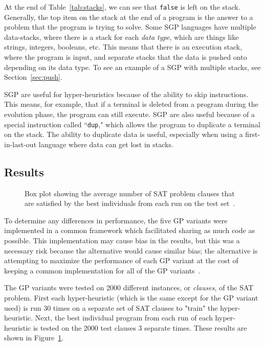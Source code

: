 \documentclass{sig-alternate}
\begin{document}
At the end of Table~\ref{tab:stacks}, we can see that \texttt{false} is left on the stack. Generally, the top item on the stack at the end of a program is the answer to a problem that the program is trying to solve. Some SGP languages have multiple data-stacks, where there is a stack for each \textit{data type}, which are things like strings, integers, booleans, etc. This means that there is an execution stack, where the program is input, and separate stacks that the data is pushed onto depending on its data type. To see an example of a SGP with multiple stacks, see Section~\ref{sec:push}.

SGP are useful for hyper-heuristics because of the ability to skip instructions. This means, for example, that if a terminal is deleted from a program during the evolution phase, the program can still execute. SGP are also useful because of a special instruction called ``\texttt{dup}," which allows the program to duplicate a terminal on the stack. The ability to duplicate data is useful, especially when using a first-in-last-out language where data can get lost in stacks.

\subsection{Results}
\label{sec:gpresults}
\begin{figure}
	\centering
	\caption{Box plot showing the average number of SAT problem clauses that are satisfied by the best individuals from each run on the test set~\cite{harris:2015}.}
	\label{fig:gpvariants}
\end{figure}

To determine any differences in performance, the five GP variants were implemented in a common framework which facilitated sharing as much code as possible. This implementation may cause bias in the results, but this was a necessary risk because the alternative would cause similar bias; the alternative is attempting to maximize the performance of each GP variant at the cost of keeping a common implementation for all of the GP variants~\cite{harris:2015}.

The GP variants were tested on 2000 different instances, or \textit{clauses}, of the SAT problem. First each hyper-heuristic (which is the same except for the GP variant used) is run 30 times on a separate set of SAT clauses to "train" the hyper-heuristic. Next, the best individual program from each run of each hyper-heuristic is tested on the 2000 test clauses 3 separate times. These results are shown in Figure~\ref{fig:gpvariants}.
\end{document}
